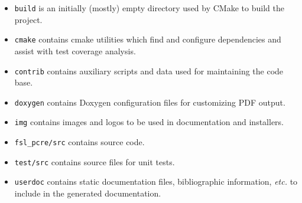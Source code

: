 \begin{itemize}
\item \texttt{build} is an initially (mostly) empty directory used by CMake to build the project.
\item \texttt{cmake} contains cmake utilities which find and configure dependencies and assist with test coverage analysis.
\item \texttt{contrib} contains auxiliary scripts and data used for maintaining the code base.
\item \texttt{doxygen} contains Doxygen configuration files for customizing PDF output.
\item \texttt{img} contains images and logos to be used in documentation and installers.
\item \texttt{fsl\_pcre/src} contains source code.
\item \texttt{test/src} contains source files for unit tests.
\item \texttt{userdoc} contains static documentation files, bibliographic information, \textit{etc.} to include in the generated documentation.
\end{itemize}

